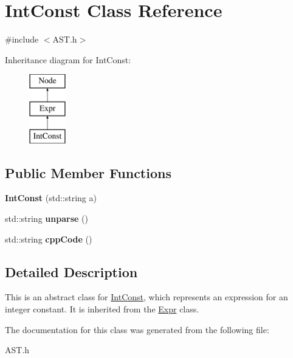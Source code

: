 \hypertarget{class_int_const}{}\section{Int\+Const Class Reference}
\label{class_int_const}


{\ttfamily \#include $<$A\+S\+T.\+h$>$}

Inheritance diagram for Int\+Const\+:\begin{figure}[H]
\begin{center}
\leavevmode
\includegraphics[height=3.000000cm]{class_int_const}
\end{center}
\end{figure}
\subsection*{Public Member Functions}
\begin{DoxyCompactItemize}
\item 
\hypertarget{class_int_const_afc3fa0ce9dd13b45f0748fb9637abc86}{}{\bfseries Int\+Const} (std\+::string a)\label{class_int_const_afc3fa0ce9dd13b45f0748fb9637abc86}

\item 
\hypertarget{class_int_const_a5306e9df07b2cb730d2a7cba3b4d2057}{}std\+::string {\bfseries unparse} ()\label{class_int_const_a5306e9df07b2cb730d2a7cba3b4d2057}

\item 
\hypertarget{class_int_const_a7e6526e71e87cd32ea336ac548ab9a00}{}std\+::string {\bfseries cpp\+Code} ()\label{class_int_const_a7e6526e71e87cd32ea336ac548ab9a00}

\end{DoxyCompactItemize}


\subsection{Detailed Description}
This is an abstract class for \hyperlink{class_int_const}{Int\+Const}, which represents an expression for an integer constant. It is inherited from the \hyperlink{class_expr}{Expr} class. 

The documentation for this class was generated from the following file\+:\begin{DoxyCompactItemize}
\item 
A\+S\+T.\+h\end{DoxyCompactItemize}
